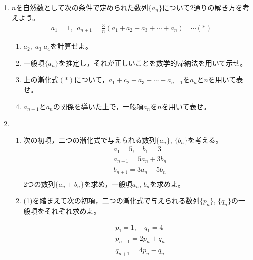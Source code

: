 \documentclass[autodetect-engine,ja=standard, 10.5pt, a4paper, titlepage]{bxjsarticle}
\begin{document}
\begin{enumerate}[1.]
  \item
  $n$を自然数として次の条件で定められた数列$\{a_n\}$について2通りの解き方を考えよう。\\ %

    \begin{align*}\label{}
      a_1 = 1,\:\: a_{n+1} = \frac{3}{n} (a_1 + a_2 + a_3 + \cdots + a_n)  \quad\cdots (*)
    \end{align*}

  \begin{enumerate}[(1)]
    \item $a_2,\;a_3\;a_4$を計算せよ。\\
    \item 一般項$\{a_n\}$を推定し，それが正しいことを数学的帰納法を用いて示せ。\\
    \item 上の漸化式$(*)$について，$a_1 + a_2 + a_3 + \cdots + a_{n-1}$を$a_n$と$n$を用いて表せ。\\
    \item $a_{n+1}$と$a_n$の関係を導いた上で，一般項$a_n$を$n$を用いて表せ。\\
  \end{enumerate}
\baselineskip
  \item
  \begin{enumerate}[(1)]
    \item 次の初項，二つの漸化式で与えられる数列$\{a_n\},\, \{b_n\}$を考える。\\
      \begin{align*}\label{}
        &a_1 = 5,\quad b_1 = 3\\
        &a_{n+1} = 5a_n + 3b_n \\
        &b_{n+1} = 3a_n + 5b_n \\
      \end{align*}
    2つの数列$\{a_n\pm b_n\}$を求め，一般項$a_n,\, b_n$を求めよ。\\

    \item (1)を踏まえて次の初項，二つの漸化式で与えられる数列$\{p_n\},\, \{q_n\}$の一般項をそれぞれ求めよ。%

        \begin{align*}\label{}
          &p_1 = 1,\quad q_1 = 4\\
          &p_{n+1} = 2p_n + q_n \\
          &q_{n+1} = 4p_n - q_n \\
        \end{align*}
    \end{enumerate}


\end{enumerate}
\end{document}
